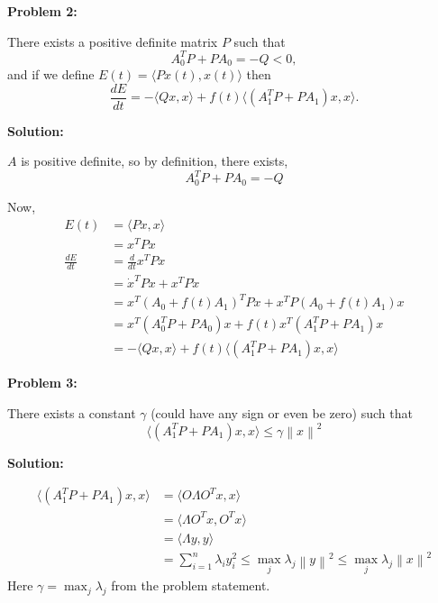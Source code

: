 \documentclass[12pt]{article}
\newcommand{\norm}[1]{\left\lVert #1 \right\rVert}
\newenvironment{problem}[1]{
    \textbf{Problem #1:}
}{
    \rmfamily \vspace{1em}
}
\newenvironment{solution}{
    \textbf{Solution:}
    
}{
    
    \vspace{2em}
}
\begin{document}
\newpage

\begin{problem}{2}
    There exists a positive definite matrix \(P\) such that
    \[
        A_0^T P + PA_0 = -Q < 0,
    \]
    and if we define \(E(t) = \langle Px(t), x(t) \rangle\) then
    \[
        \frac{dE}{dt} = -\langle Qx, x \rangle + f(t)\langle(A_1^T P + PA_1)x, x \rangle.
    \]
\end{problem}

\begin{solution}
\(A\) is positive definite, so by definition, there exists,
\[
    A_0^T P + PA_0 = -Q
\]

Now,
\[
    \begin{aligned}
        E(t) &= \langle Px, x \rangle \\
        &= x^TP x\\
        \frac{dE}{dt} &= \frac{d}{dt}x^TP x \\
        &= \dot{x}^TP x + x^TP \dot{x} \\
        &= x^T(A_0 + f(t)A_1)^T P x + x^TP (A_0 + f(t)A_1) x \\
        &= x^T(A_0^T P + PA_0) x + f(t)x^T(A_1^T P + PA_1) x \\
        &= -\langle Qx, x \rangle + f(t)\langle (A_1^T P + PA_1)x, x \rangle
    \end{aligned}
\]

\end{solution}

\newpage

\begin{problem}{3}
There exists a constant \(\gamma\) (could have any sign or even be zero) such that
\[
    \langle (A_1^T P + PA_1)x, x \rangle \leq \gamma \norm{x}^2
\]
\end{problem}

\begin{solution}
\[
    \begin{aligned}
        \langle (A_1^T P + PA_1)x, x \rangle &= \langle O \Lambda O^T x, x \rangle \\
        &= \langle \Lambda O^T x, O^T x \rangle \\
        &= \langle \Lambda y, y \rangle \\
        &= \sum_{i=1}^n \lambda_i y_i^2 \leq \max_j \lambda_j \norm{y}^2 \leq \max_j \lambda_j \norm{x}^2
    \end{aligned}
\]
Here \(\gamma = \max_j \lambda_j\) from the problem statement.
\end{solution}
\end{document}
